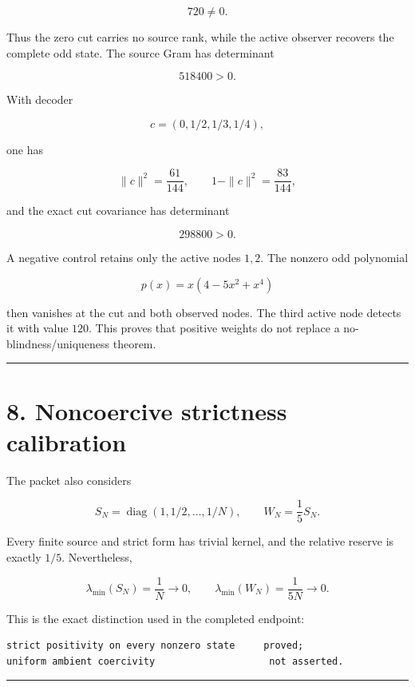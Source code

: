 \[
720\ne0.
\]

Thus the zero cut carries no source rank, while the active observer recovers
the complete odd state. The source Gram has determinant

\[
518400>0.
\]

With decoder

\[
c=(0,1/2,1/3,1/4),
\]

one has

\[
\|c\|^2=\frac{61}{144},
\qquad
1-\|c\|^2=\frac{83}{144},
\]

and the exact cut covariance has determinant

\[
298800>0.
\]

A negative control retains only the active nodes \(1,2\). The nonzero odd
polynomial

\[
p(x)=x(4-5x^2+x^4)
\]

then vanishes at the cut and both observed nodes. The third active node detects
it with value \(120\). This proves that positive weights do not replace a
no-blindness/uniqueness theorem.

\begin{center}\rule{0.5\linewidth}{0.5pt}\end{center}

\hypertarget{noncoercive-strictness-calibration}{%
\section{8. Noncoercive strictness calibration}\label{noncoercive-strictness-calibration}}

The packet also considers

\[
S_N=\operatorname{diag}(1,1/2,\ldots,1/N),
\qquad
W_N=\frac15S_N.
\]

Every finite source and strict form has trivial kernel, and the relative reserve
is exactly \(1/5\). Nevertheless,

\[
\lambda_{\min}(S_N)=\frac1N\to0,
\qquad
\lambda_{\min}(W_N)=\frac1{5N}\to0.
\]

This is the exact distinction used in the completed endpoint:

\begin{verbatim}
strict positivity on every nonzero state     proved;
uniform ambient coercivity                    not asserted.
\end{verbatim}

\begin{center}\rule{0.5\linewidth}{0.5pt}\end{center}

